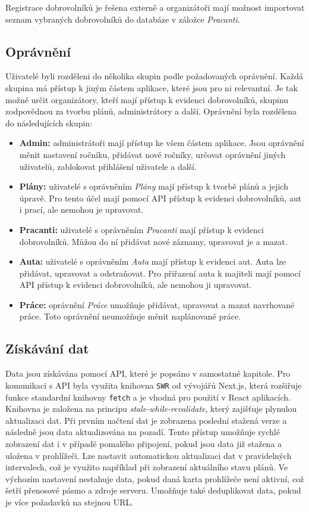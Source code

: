 Registrace dobrovolníků je řešena externě a organizátoři mají možnost importovat seznam vybraných dobrovolníků do databáze v záložce \textit{Pracanti}.

\subsection{Oprávnění}

Uživatelé byli rozděleni do několika skupin podle požadovaných oprávnění. Každá skupina má přístup k jiným částem aplikace, které jsou pro ni relevantní.
Je tak možné určit organizátory, kteří mají přístup k evidenci dobrovolníků, skupinu zodpovědnou za tvorbu plánů, administrátory a další.
Oprávnění byla rozdělena do následujících skupin:

\begin{itemize}
    \item \textbf{Admin:} administrátoři mají přístup ke všem částem aplikace. Jsou oprávnění měnit nastavení ročníku, přidávat nové ročníky, určovat oprávnění jiných uživatelů, zablokovat přihlášení uživatele a další.
    \item \textbf{Plány:} uživatelé s oprávněním \textit{Plány} mají přístup k tvorbě plánů a jejich úpravě. Pro tento účel mají pomocí API přístup k evidenci dobrovolníků, aut i prací, ale nemohou je upravovat.
    \item \textbf{Pracanti:} uživatelé s oprávněním \textit{Pracanti} mají přístup k evidenci dobrovolníků. Můžou do ní přidávat nové záznamy, upravovat je a mazat.
    \item \textbf{Auta:} uživatelé s oprávněním \textit{Auta} mají přístup k evidenci aut. Auta lze přidávat, upravovat a odstraňovat. Pro přiřazení auta k majiteli mají pomocí API přístup k evidenci dobrovolníků, ale nemohou ji upravovat.
    \item \textbf{Práce:} oprávnění \textit{Práce} umožňuje přidávat, upravovat a mazat navrhované práce. Toto oprávnění neumožňuje měnit naplánované práce.
\end{itemize}

\subsection{Získávání dat}

Data jsou získávána pomocí API, které je popsáno v samostatné kapitole. Pro komunikaci s API byla využita knihovna \texttt{SWR} od vývojářů Next.js, která
rozšiřuje funkce standardní knihovny \texttt{fetch} a je vhodná pro použití v React aplikacích. Knihovna je založena na principu \textit{stale-while-revalidate},
který zajišťuje plynulou aktualizaci dat. Při prvním načtení dat je zobrazena poslední stažená verze a následně jsou data aktualizována na pozadí. Tento přístup
umožňuje rychlé zobrazení dat i v případě pomalého připojení, pokud jsou data již stažena a uložena v prohlížeči. Lze nastavit automatickou aktualizaci dat 
v pravidelných intervalech, což je využito například při zobrazení aktuálního stavu plánů. Ve výchozím nastavení nestahuje data, pokud daná karta prohlížeče není
aktivní, což šetří přenosové pásmo a zdroje serveru. Umožňuje také deduplikovat data, pokud je více požadavků na stejnou URL.


